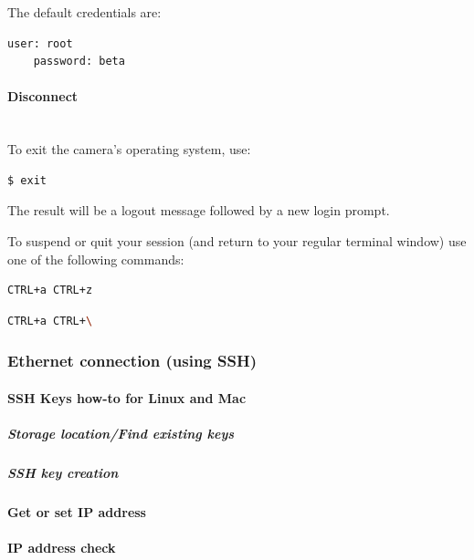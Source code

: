 The default credentials are: 

\begin{lstlisting}[language=bash,morekeywords=$,keywordstyle=\bfseries,frame=none,xleftmargin=.25in,belowskip=2em, aboveskip=2em]
    user: root
    password: beta
\end{lstlisting}


\paragraph{Disconnect}\\

To exit the camera's operating system, use: 

\begin{lstlisting}[language=bash,morekeywords=$,keywordstyle=\bfseries,frame=none,xleftmargin=.25in,belowskip=2em, aboveskip=2em]
$ exit
\end{lstlisting}

The result will be a logout message followed by a new login prompt.

To suspend or quit your  session (and return to your regular terminal window) use one of the following commands: 

\begin{lstlisting}[language=bash,morekeywords=$,keywordstyle=\bfseries,frame=none,xleftmargin=.25in,belowskip=2em, aboveskip=2em]
CTRL+a CTRL+z
\end{lstlisting}

\begin{lstlisting}[language=bash,morekeywords=$,keywordstyle=\bfseries,frame=none,xleftmargin=.25in,belowskip=2em, aboveskip=2em]
CTRL+a CTRL+\
\end{lstlisting}


\subsubsection{Ethernet connection (using SSH)}
\paragraph{SSH Keys how-to for Linux and Mac}
\subparagraph{Storage location/Find existing keys}
\subparagraph{SSH key creation}
\paragraph{Get or set IP address}
\paragraph{IP address check}
